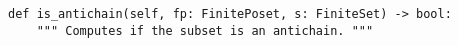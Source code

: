 \begin{verbatim}
def is_antichain(self, fp: FinitePoset, s: FiniteSet) -> bool:
    """ Computes if the subset is an antichain. """
\end{verbatim}